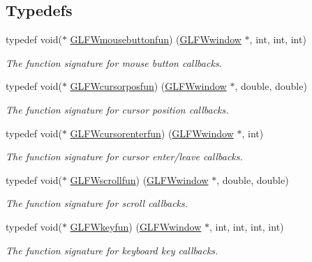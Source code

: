 \subsection*{Typedefs}
\begin{DoxyCompactItemize}
\item 
typedef void($\ast$ \hyperlink{group__input_ga39893a4a7e7c3239c98d29c9e084350c}{G\+L\+F\+Wmousebuttonfun}) (\hyperlink{group__window_ga3c96d80d363e67d13a41b5d1821f3242}{G\+L\+F\+Wwindow} $\ast$, int, int, int)
\begin{DoxyCompactList}\small\item\em The function signature for mouse button callbacks. \end{DoxyCompactList}\item 
typedef void($\ast$ \hyperlink{group__input_ga4cfad918fa836f09541e7b9acd36686c}{G\+L\+F\+Wcursorposfun}) (\hyperlink{group__window_ga3c96d80d363e67d13a41b5d1821f3242}{G\+L\+F\+Wwindow} $\ast$, double, double)
\begin{DoxyCompactList}\small\item\em The function signature for cursor position callbacks. \end{DoxyCompactList}\item 
typedef void($\ast$ \hyperlink{group__input_ga51ab436c41eeaed6db5a0c9403b1c840}{G\+L\+F\+Wcursorenterfun}) (\hyperlink{group__window_ga3c96d80d363e67d13a41b5d1821f3242}{G\+L\+F\+Wwindow} $\ast$, int)
\begin{DoxyCompactList}\small\item\em The function signature for cursor enter/leave callbacks. \end{DoxyCompactList}\item 
typedef void($\ast$ \hyperlink{group__input_ga4687e2199c60a18a8dd1da532e6d75c9}{G\+L\+F\+Wscrollfun}) (\hyperlink{group__window_ga3c96d80d363e67d13a41b5d1821f3242}{G\+L\+F\+Wwindow} $\ast$, double, double)
\begin{DoxyCompactList}\small\item\em The function signature for scroll callbacks. \end{DoxyCompactList}\item 
typedef void($\ast$ \hyperlink{group__input_ga0192a232a41e4e82948217c8ba94fdfd}{G\+L\+F\+Wkeyfun}) (\hyperlink{group__window_ga3c96d80d363e67d13a41b5d1821f3242}{G\+L\+F\+Wwindow} $\ast$, int, int, int, int)
\begin{DoxyCompactList}\small\item\em The function signature for keyboard key callbacks. \end{DoxyCompactList}\item 

\end{DoxyCompactItemize}
